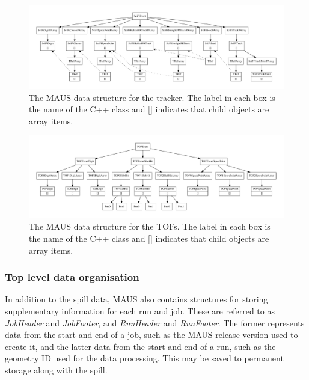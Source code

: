 \documentclass[11pt]{article}
\begin{document}
\begin{figure}[ptb]
\centering
\includegraphics[width=1.0\textheight,angle=90,origin=c]{figs/scifi_datastructure.pdf}
\caption{The MAUS data structure for the tracker. The label in each box is the name of the C++ class and []  indicates that child objects are array items.}
\label{fig:datastructure-recon-scifi}
\end{figure}

\begin{figure}[ptb]
\centering
\includegraphics[width=1.0\textheight,angle=90,origin=c]{figs/tof_datastructure.pdf}
\caption{The MAUS data structure for the TOFs. The label in each box is the name of the C++ class and [] indicates that child objects are array items.}
\label{fig:datastructure-recon-tof}
\end{figure}

\FloatBarrier

\subsubsection{Top level data organisation} \label{sec:top-level-datastr}

In addition to the spill data, MAUS also contains structures for storing supplementary information for each run and job. These are referred to as \emph{JobHeader} and \emph{JobFooter}, and \emph{RunHeader} and \emph{RunFooter}. The former represents data from the start and end of a job, such as the MAUS release version used to create it, and the latter data from the start and end of a run, such as the geometry ID used for the data processing. This may be saved to permanent storage along with the spill.
\end{document}
